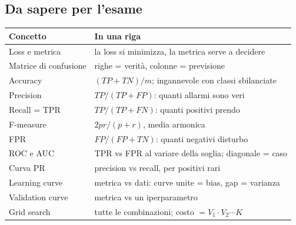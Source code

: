 \subsection{Da sapere per l'esame}
\begin{center}
    \begin{tabular}{l|l}
        \textbf{Concetto} & \textbf{In una riga} \\ \hline
        Loss e metrica        & la loss si minimizza, la metrica serve a decidere \\ \hline
        Matrice di confusione & righe = verità, colonne = previsione \\ \hline
        Accuracy              & $(TP+TN)/m$; ingannevole con classi sbilanciate \\ \hline
        Precision             & $TP/(TP+FP)$: quanti allarmi sono veri \\ \hline
        Recall = TPR          & $TP/(TP+FN)$: quanti positivi prendo \\ \hline
        F-measure             & $2pr/(p+r)$, media armonica \\ \hline
        FPR                   & $FP/(FP+TN)$: quanti negativi disturbo \\ \hline
        ROC e AUC             & TPR vs FPR al variare della soglia; diagonale = caso \\ \hline
        Curva PR              & precision vs recall, per positivi rari \\ \hline
        Learning curve        & metrica vs dati: curve unite = bias, gap = varianza \\ \hline
        Validation curve      & metrica vs un iperparametro \\ \hline
        Grid search           & tutte le combinazioni; costo $= V_1 \cdot V_2 \cdots K$ \\
    \end{tabular}
\end{center}

